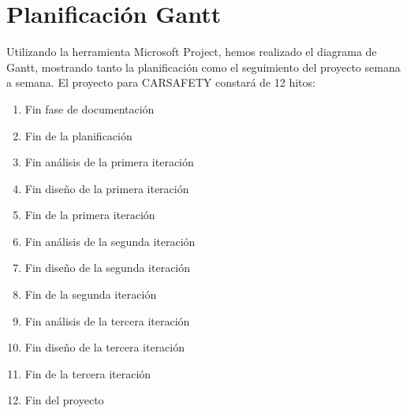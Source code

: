 \section{Planificación Gantt}

\par Utilizando la herramienta Microsoft Project, hemos realizado el diagrama de Gantt, mostrando tanto la planificación como el seguimiento del proyecto semana a semana. El proyecto para CARSAFETY constará de 12 hitos:

\begin{enumerate}
  \item Fin fase de documentación
  \item Fin de la planificación
  \item Fin análisis de la primera iteración
  \item Fin diseño de la primera iteración
  \item Fin de la primera iteración
  \item Fin análisis de la segunda iteración
  \item Fin diseño de la segunda iteración
  \item Fin de la segunda iteración
  \item Fin análisis de la tercera iteración
  \item Fin diseño de la tercera iteración
  \item Fin de la tercera iteración
  \item Fin del proyecto
\end{enumerate}

